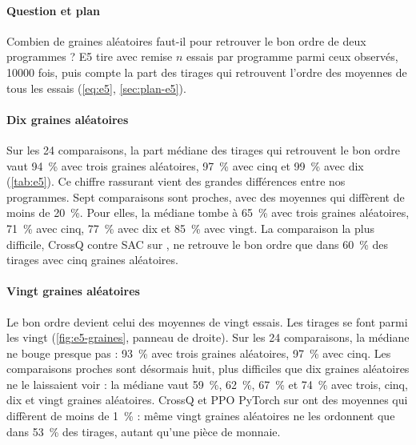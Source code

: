 \paragraph{Question et plan}
Combien de graines aléatoires faut-il pour retrouver le bon ordre de deux programmes ? E5 tire avec remise
$n$ essais par programme parmi ceux observés, \num{10000} fois, puis compte la part des tirages qui retrouvent
l'ordre des moyennes de tous les essais (\cref{eq:e5}, \cref{sec:plan-e5}).

\paragraph{Dix graines aléatoires}
Sur les 24 comparaisons, la part médiane des tirages qui retrouvent le bon ordre vaut 94~\% avec trois
graines aléatoires, 97~\% avec cinq et 99~\% avec dix (\cref{tab:e5}). Ce chiffre rassurant vient des grandes différences
entre nos programmes. Sept comparaisons sont proches, avec des moyennes qui diffèrent de moins de 20~\%. Pour
elles, la médiane tombe à 65~\% avec trois graines aléatoires, 71~\% avec cinq, 77~\% avec dix et 85~\% avec vingt. La
comparaison la plus difficile, CrossQ contre SAC sur , ne retrouve le bon ordre que dans
60~\% des tirages avec cinq graines aléatoires.


\paragraph{Vingt graines aléatoires}
Le bon ordre devient celui des moyennes de vingt essais. Les tirages se font parmi les vingt (\cref{fig:e5-graines}, panneau de droite). Sur les 24
comparaisons, la médiane ne bouge presque pas : 93~\% avec trois graines aléatoires, 97~\% avec cinq. Les comparaisons
proches sont désormais huit, plus difficiles que dix graines aléatoires ne le laissaient voir : la médiane vaut 59~\%,
62~\%, 67~\% et 74~\% avec trois, cinq, dix et vingt graines aléatoires. CrossQ et PPO PyTorch sur  ont des
moyennes qui diffèrent de moins de 1~\% : même vingt graines aléatoires ne les ordonnent que dans 53~\% des tirages,
autant qu'une pièce de monnaie.


